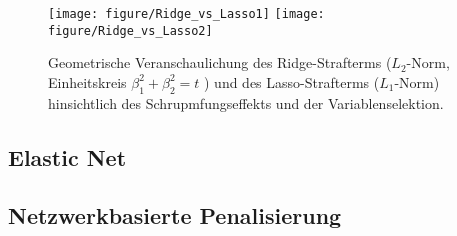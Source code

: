 \documentclass[12pt, a4paper]{report}\usepackage[]{graphicx}\usepackage[]{color}
\newenvironment{knitrout}{}{} %
\begin{document}
\begin{knitrout}
\color{fgcolor}\begin{figure}[H]


{\centering \texttt{[image: figure/Ridge\_vs\_Lasso1]} 
\texttt{[image: figure/Ridge\_vs\_Lasso2]} 

}

\caption[Geometrische Veranschaulichung des Ridge-Strafterms ($L_2$-Norm, Einheitskreis $ \beta_1^2 + \beta_2^2 = t$ ) und des Lasso-Strafterms ($L_1$-Norm) hinsichtlich des Schrupmfungseffekts und der Variablenselektion]{Geometrische Veranschaulichung des Ridge-Strafterms ($L_2$-Norm, Einheitskreis $ \beta_1^2 + \beta_2^2 = t$ ) und des Lasso-Strafterms ($L_1$-Norm) hinsichtlich des Schrupmfungseffekts und der Variablenselektion.\label{fig:Ridge_vs_Lasso}}
\end{figure}


\end{knitrout}

\subsection{Elastic Net}\label{Kap_Elastic-Net}
\subsection{Netzwerkbasierte Penalisierung}\label{Netzwerkbasierte_Penalisierung}




\end{document}
